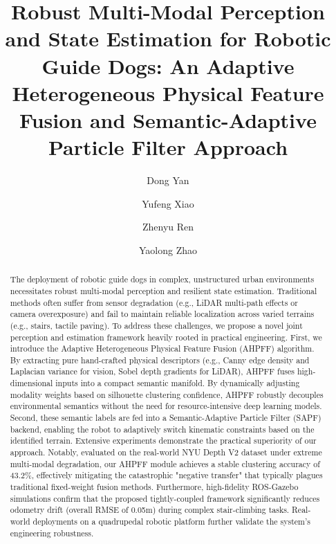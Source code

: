 \documentclass[final,3p,times]{elsarticle}
\begin{document}
\begin{frontmatter}

\title{Robust Multi-Modal Perception and State Estimation for Robotic Guide Dogs: An Adaptive Heterogeneous Physical Feature Fusion and Semantic-Adaptive Particle Filter Approach}

\author[inst1]{Dong Yan}
\author[inst1]{Yufeng Xiao}

\author[inst1]{Zhenyu Ren}
\author[inst1]{Yaolong Zhao}


\begin{abstract}
The deployment of robotic guide dogs in complex, unstructured urban environments necessitates robust multi-modal perception and resilient state estimation. Traditional methods often suffer from sensor degradation (e.g., LiDAR multi-path effects or camera overexposure) and fail to maintain reliable localization across varied terrains (e.g., stairs, tactile paving). To address these challenges, we propose a novel joint perception and estimation framework heavily rooted in practical engineering. First, we introduce the Adaptive Heterogeneous Physical Feature Fusion (AHPFF) algorithm. By extracting pure hand-crafted physical descriptors (e.g., Canny edge density and Laplacian variance for vision, Sobel depth gradients for LiDAR), AHPFF fuses high-dimensional inputs into a compact semantic manifold. By dynamically adjusting modality weights based on silhouette clustering confidence, AHPFF robustly decouples environmental semantics without the need for resource-intensive deep learning models. Second, these semantic labels are fed into a Semantic-Adaptive Particle Filter (SAPF) backend, enabling the robot to adaptively switch kinematic constraints based on the identified terrain. Extensive experiments demonstrate the practical superiority of our approach. Notably, evaluated on the real-world NYU Depth V2 dataset under extreme multi-modal degradation, our AHPFF module achieves a stable clustering accuracy of 43.2\%, effectively mitigating the catastrophic "negative transfer" that typically plagues traditional fixed-weight fusion methods. Furthermore, high-fidelity ROS-Gazebo simulations confirm that the proposed tightly-coupled framework significantly reduces odometry drift (overall RMSE of 0.05m) during complex stair-climbing tasks. Real-world deployments on a quadrupedal robotic platform further validate the system's engineering robustness.
\end{abstract}


\end{frontmatter}
\end{document}
